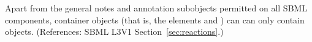 Apart from the general notes and annotation subobjects permitted on all
SBML components, \ListOfSpeciesReferences container objects (that is, the
\Reaction elements  and ) can
can only contain \SpeciesReference objects.  (References: SBML L3V1
Section~\ref{sec:reactions}.)
